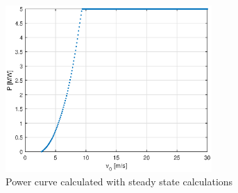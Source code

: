 \begin{figure}[htbp]
	\centering
	\includegraphics[width=0.7\textwidth]{Figures/P_Vs_v.eps}
	\caption{Power curve calculated with steady state calculations}
	\label{fig:power cureve} 
\end{figure}
